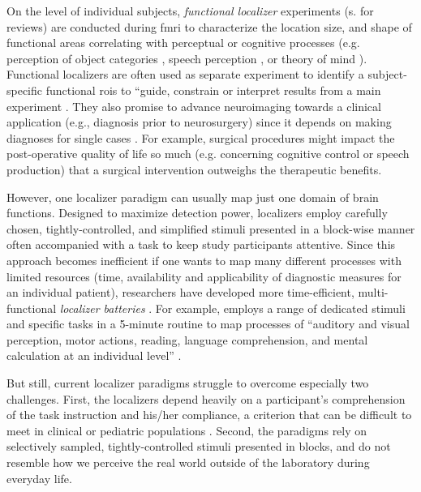
On the level of individual subjects, \textit{functional localizer} experiments
(s. \citep{saxe2006divide, friston2006critique} for reviews) are conducted
during \ac{fmri} to characterize the location size, and shape of functional
areas correlating with perceptual or cognitive processes (e.g. perception of
object categories \citep{kanwisher1997ffa}, speech perception
\citep{fernandez2001language}, or theory of mind \citep{spunt2014validating}).
Functional localizers are often used as separate experiment to identify a
subject-specific functional \acp{roi} to ``guide, constrain or interpret results
from a main experiment \citep{saxe2006divide}.
They also promise to advance neuroimaging towards a clinical application (e.g.,
diagnosis prior to neurosurgery) since it depends on making diagnoses for single
cases \citep{wegrzyn2018thought}.
For example, surgical procedures might impact the post-operative quality of life
so much (e.g. concerning cognitive control or speech production) that a
surgical intervention outweighs the therapeutic benefits.

However, one localizer paradigm can usually map just one domain of brain
functions.
Designed to maximize detection power, localizers employ carefully chosen,
tightly-controlled, and simplified stimuli presented in a block-wise manner
often accompanied with a task to keep study participants attentive.
Since this approach becomes inefficient if one wants to map many different
processes with limited resources (time, availability and applicability of
diagnostic measures for an individual patient), researchers have developed more
time-efficient, multi-functional \textit{localizer batteries}
\citep{barch2013function, drobyshevsky2006rapid, pinel2007fast}.
For example, \citet{pinel2007fast} employs a range of dedicated stimuli and
specific tasks in a 5-minute routine to map processes of ``auditory and visual
perception, motor actions, reading, language comprehension, and mental
calculation at an individual level'' \citep{pinel2007fast}.

But still, current localizer paradigms struggle to overcome especially two
challenges.
%
First, the localizers depend heavily on a participant's comprehension of the
task instruction and his/her compliance, a criterion that can be difficult to
meet in clinical or pediatric populations \citep{eickhoff2020towards,
vanderwal2015inscapes, vanderwal2019movies}.
Second, the paradigms rely on selectively sampled, tightly-controlled stimuli
presented in blocks, and do not resemble how we perceive the real world outside
of the laboratory during everyday life.


